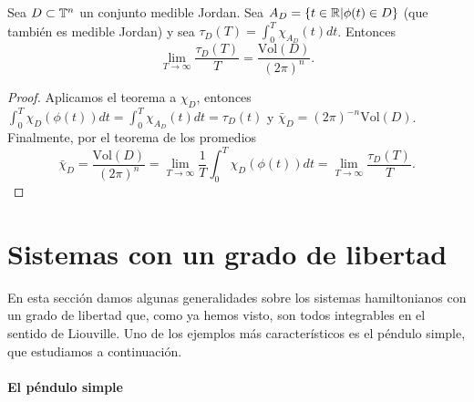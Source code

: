 \begin{corol}
  Sea $D\subset \mathbb{T}^n$ un conjunto medible Jordan. Sea $A_D=\{t\in \mathbb{R} | \phi(t) \in D\}$ (que también es medible Jordan) y sea $\tau_D(T)=\int_0^T\chi_{A_D}(t)dt$. Entonces
  \begin{equation*}
    \lim_{T\rightarrow \infty}\frac{\tau_D(T)}{T}= \frac{\mathrm{Vol}(D)}{(2\pi)^n}.
  \end{equation*}
\end{corol}
\begin{proof}
  Aplicamos el teorema a $\chi_D$, entonces $\int_0^T \chi_D(\phi(t))dt=\int_0^T \chi_{A_D}(t)dt=\tau_D(t)$ y $\bar{\chi}_D=(2\pi)^{-n}\mathrm{Vol}(D)$. Finalmente, por el teorema de los promedios
  \begin{equation*}
    \bar{\chi}_D=\frac{\mathrm{Vol}(D)}{(2\pi)^n}=\lim_{T\rightarrow \infty}\frac{1}{T}\int_0^T \chi_D(\phi(t))dt=\lim_{T\rightarrow \infty}\frac{\tau_D(T)}{T}.
  \end{equation*}
\end{proof}

\section{Sistemas con un grado de libertad}
En esta sección damos algunas generalidades sobre los sistemas hamiltonianos con un grado de libertad que, como ya hemos visto, son todos integrables en el sentido de Liouville. Uno de los ejemplos más característicos es el péndulo simple, que estudiamos a continuación.
  
\paragraph{\bf El péndulo simple}\mbox{}
  
